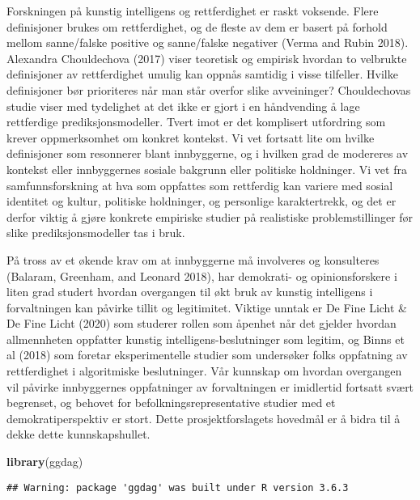 \documentclass[
]{book}
\newenvironment{Shaded}{\begin{snugshade}}{\end{snugshade}}
\newcommand{\KeywordTok}[1]{\textcolor[rgb]{0.13,0.29,0.53}{\textbf{#1}}}
\newcommand{\NormalTok}[1]{#1}
\begin{document}
Forskningen på kunstig intelligens og rettferdighet er raskt voksende.
Flere definisjoner brukes om rettferdighet, og de fleste av dem er basert på forhold mellom sanne/falske positive og sanne/falske negativer (Verma and Rubin 2018).
Alexandra Chouldechova (2017) viser teoretisk og empirisk hvordan to velbrukte definisjoner av rettferdighet umulig kan oppnås samtidig i visse tilfeller.
Hvilke definisjoner bør prioriteres når man står overfor slike avveininger?
Chouldechovas studie viser med tydelighet at det ikke er gjort i en håndvending å lage rettferdige prediksjonsmodeller.
Tvert imot er det komplisert utfordring som krever oppmerksomhet om konkret kontekst.
Vi vet fortsatt lite om hvilke definisjoner som resonnerer blant innbyggerne, og i hvilken grad de modereres av kontekst eller innbyggernes sosiale bakgrunn eller politiske holdninger.
Vi vet fra samfunnsforskning at hva som oppfattes som rettferdig kan variere med sosial identitet og kultur, politiske holdninger, og personlige karaktertrekk, og det er derfor viktig å gjøre konkrete empiriske studier på realistiske problemstillinger før slike prediksjonsmodeller tas i bruk.

På tross av et økende krav om at innbyggerne må involveres og konsulteres (Balaram, Greenham, and Leonard 2018), har demokrati- og opinionsforskere i liten grad studert hvordan overgangen til økt bruk av kunstig intelligens i forvaltningen kan påvirke tillit og legitimitet.
Viktige unntak er De Fine Licht \& De Fine Licht (2020) som studerer rollen som åpenhet når det gjelder hvordan allmennheten oppfatter kunstig intelligens-beslutninger som legitim, og Binns et al (2018) som foretar eksperimentelle studier som undersøker folks oppfatning av rettferdighet i algoritmiske beslutninger.
Vår kunnskap om hvordan overgangen vil påvirke innbyggernes oppfatninger av forvaltningen er imidlertid fortsatt svært begrenset, og behovet for befolkningsrepresentative studier med et demokratiperspektiv er stort. Dette prosjektforslagets hovedmål er å bidra til å dekke dette kunnskapshullet.

\begin{Shaded}
\begin{Highlighting}[]
\KeywordTok{library}\NormalTok{(ggdag)}
\end{Highlighting}
\end{Shaded}

\begin{verbatim}
## Warning: package 'ggdag' was built under R version 3.6.3
\end{verbatim}
\end{document}
